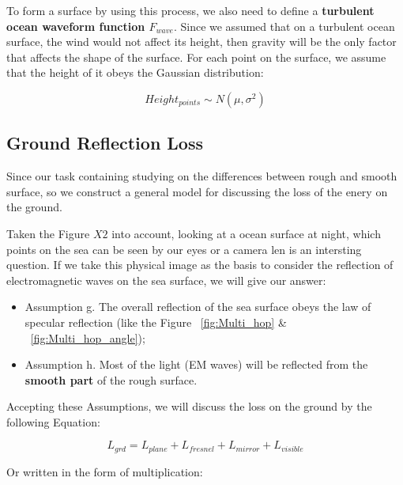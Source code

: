 \documentclass{mcmthesis}
\begin{document}
    To form a surface by using this process, we also need to define a \textbf{turbulent ocean waveform function $F_{wave}$}. Since we assumed that on a turbulent ocean surface, the wind would not affect its height, then gravity will be the only factor that affects the shape of the surface. For each point on the surface, we assume that the height of it obeys the Gaussian distribution:

    \begin{equation}\label{eq:Height_Gaussian}
      Height_{points} \sim N(\mu,\sigma^2)
    \end{equation}







  \subsection{Ground Reflection Loss}
    Since our task containing studying on the differences between rough and smooth surface, so we construct a general model for discussing the loss of the enery on the ground.

    Taken the Figure $X2$ into account, looking at a ocean surface at night, which points on the sea can be seen by our eyes or a camera len is an intersting question. If we take this physical image as the basis to consider the reflection of electromagnetic waves on the sea surface, we will give our answer:

    \begin{itemize}
      \item Assumption g. The overall reflection of the sea surface obeys the law of specular reflection (like the Figure ~\ref{fig:Multi_hop} \& ~\ref{fig:Multi_hop_angle}); \\
      \item Assumption h. Most of the light (EM waves) will be reflected from the \textbf{smooth part} of the rough surface. \\
    \end{itemize}

    Accepting these Assumptions, we will discuss the loss on the ground by the following Equation:

    \begin{equation}\label{eq:grd_L_totle}
      L_{grd} = L_{plane} + L_{fresnel} + L_{mirror} + L_{visible}
    \end{equation}

    Or written in the form of multiplication:
\end{document}
